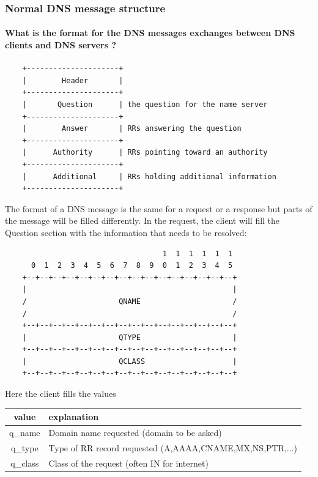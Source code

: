\subsubsection{Normal DNS message structure}
\paragraph{What is the format for the DNS messages exchanges between DNS clients and DNS servers ?}
\begin{verbatim}
    +---------------------+
    |        Header       |
    +---------------------+
    |       Question      | the question for the name server
    +---------------------+
    |        Answer       | RRs answering the question
    +---------------------+
    |      Authority      | RRs pointing toward an authority
    +---------------------+
    |      Additional     | RRs holding additional information
    +---------------------+

\end{verbatim}
The format of a DNS message is the same for a request or a response but parts of the message will be filled differently. In the request, the client will fill the Question section with the information that needs to be resolved:
\begin{verbatim}
                                    1  1  1  1  1  1
      0  1  2  3  4  5  6  7  8  9  0  1  2  3  4  5
    +--+--+--+--+--+--+--+--+--+--+--+--+--+--+--+--+
    |                                               |
    /                     QNAME                     /
    /                                               /
    +--+--+--+--+--+--+--+--+--+--+--+--+--+--+--+--+
    |                     QTYPE                     |
    +--+--+--+--+--+--+--+--+--+--+--+--+--+--+--+--+
    |                     QCLASS                    |
    +--+--+--+--+--+--+--+--+--+--+--+--+--+--+--+--+
\end{verbatim}
Here the client fills the values \\
\begin{tabular}{c|l}
value & explanation\\
\hline
q\_name  & Domain name requested (domain to be asked) \\

q\_type  & Type of RR record requested (A,AAAA,CNAME,MX,NS,PTR,...) \\
q\_class & Class of the request (often IN for internet) \\
\end{tabular}

